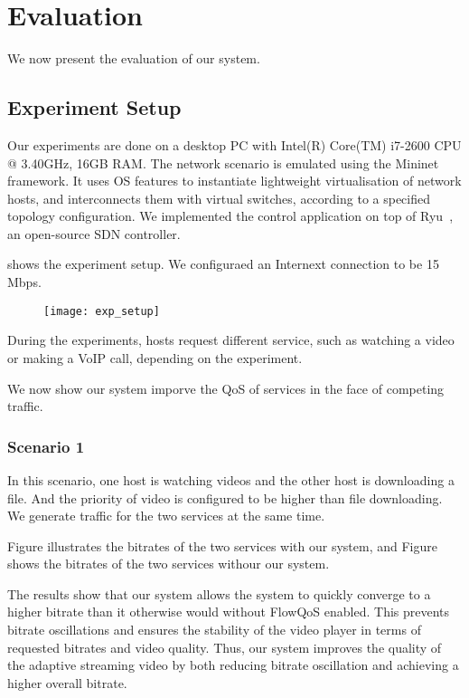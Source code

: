 \section{Evaluation}
\label{sect:experiment}
We now present the evaluation of our system. 

\subsection{Experiment Setup}
Our experiments are done on a desktop PC with Intel(R) Core(TM) i7-2600 CPU @ 3.40GHz, 16GB RAM. The network scenario is emulated using the Mininet~\cite{mininet} framework.
It uses OS features to instantiate lightweight virtualisation of network hosts, and interconnects them with virtual switches, according to a specified topology configuration.
We implemented the control application on top of Ryu~\cite{ryu}, an open-source SDN controller.

 shows the experiment setup. We configuraed an Internext connection to be 15 Mbps.

\begin{figure}[htb]
\centering
\texttt{[image: exp\_setup]}
\caption{}
\label{fig:setup}
\end{figure}

During the experiments, hosts request different service, such as watching a video or making a VoIP call, depending on the experiment. 

We now show our system imporve the QoS of services in the face of competing traffic.
\subsubsection{Scenario 1}
In this scenario, one host is watching videos and the other host is downloading a file. And the priority of video is configured to be higher than file downloading. We generate traffic for the two services at the same time.

Figure illustrates the bitrates of the two services with our system, and Figure shows the bitrates of the two services withour our system. 

The results show that our system allows the system to quickly converge to a higher bitrate than it otherwise would without FlowQoS enabled. This prevents
bitrate oscillations and ensures the stability of the video player in terms of requested bitrates and video quality.
Thus, our system improves the quality of the adaptive streaming video by both reducing bitrate oscillation and achieving a higher overall bitrate.

